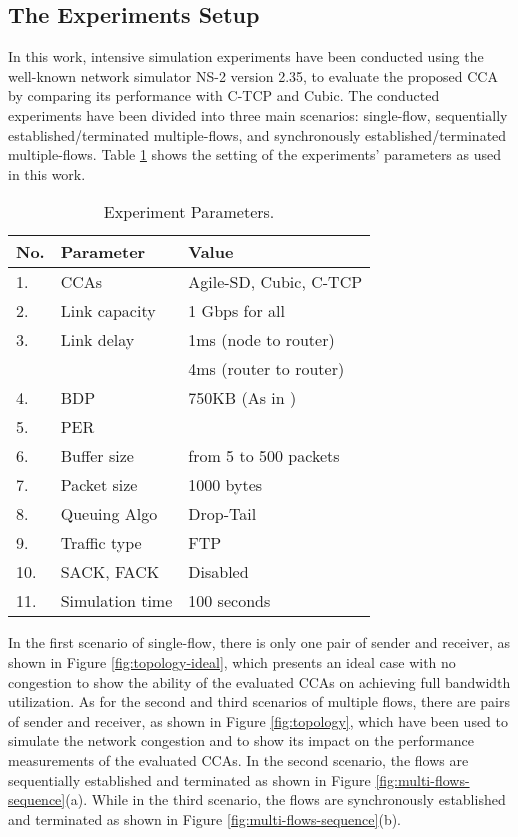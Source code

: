 \documentclass[preprint,3p,times,twocolumn,authoryear]{elsarticle}
\begin{document}
\subsection{The Experiments Setup}
In this work, intensive simulation experiments have been conducted using the well-known network simulator NS-2 version 2.35, to evaluate the proposed CCA by comparing its performance with C-TCP and \mbox{Cubic}. The conducted experiments have been divided into three main scenarios: single-flow, sequentially established/terminated multiple-flows, and synchronously established/terminated multiple-flows. Table \ref{params} shows the setting of the experiments' parameters as used in this work.
\begin{table}[h!]
	\caption{Experiment Parameters.}
	\begin{center}
	\begin{tabular}{p{0.15cm}p{2.24cm}p{4.16cm}} \hline
	No.& Parameter			&	Value									\\ \hline
	1. & CCAs				&	Agile-SD, Cubic, C-TCP					\\ 2. & Link capacity		&	1 Gbps for all							\\ 3. & Link delay			&	1ms (node to router)						\\ & 					&	4ms (router to router)					\\ 4. & BDP				&	750KB (As in \citep{RFC1072})			\\ 5. & PER				&   				\\6. & Buffer size		&	from 5 to 500 packets					\\ 7. & Packet size		&	1000 bytes								\\ 8. & Queuing Algo	 	&	Drop-Tail								\\ 9. & Traffic type		&	FTP										\\ 10. & SACK, FACK		&	Disabled								\\ 11. & Simulation time	&	100 seconds								\\ \hline
	\end{tabular}
	\label{params}
	\end{center}
\end{table}

In the first scenario of single-flow, there is only one pair of sender and receiver, as shown in Figure \ref{fig:topology-ideal}, which presents an ideal case with no congestion to show the ability of the evaluated CCAs on achieving full bandwidth utilization. As for the second and third scenarios of multiple flows, there are  pairs of sender and receiver, as shown in Figure \ref{fig:topology}, which have been used to simulate the network congestion and to show its impact on the performance measurements of the evaluated CCAs. In the second scenario, the flows are sequentially established and terminated as shown in Figure \ref{fig:multi-flows-sequence}(a). While in the third scenario, the flows are synchronously established and terminated as shown in Figure \ref{fig:multi-flows-sequence}(b).
\end{document}
